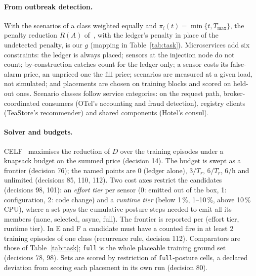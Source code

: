 \documentclass{ceurart}
\begin{document}
\paragraph{From outbreak detection.} With the scenarios of a class weighted equally and $\pi_i(t) = \min\{t, T_{\max}\}$,
the penalty reduction $R(A)$ of~\cite{leskovec_cost-effective_2007}, with the ledger's penalty in place of the undetected
penalty, is our $g$ (mapping in Table~\ref{tab:task}). Microservices add six constraints: the ledger is always placed;
sensors at the injection node do not count; by-construction catches count for the ledger only; a sensor costs its
false-alarm price, an unpriced one the fill price; scenarios are measured at a given load, not simulated; and placements
are chosen on training blocks and scored on held-out ones. Scenario classes follow service categories: on the request path,
broker-coordinated consumers (OTel's accounting and fraud detection), registry clients (TeaStore's recommender) and shared
components (Hotel's consul).

\paragraph{Solver and budgets.} CELF~\cite{leskovec_cost-effective_2007} maximises the reduction of $D$ over the training episodes under a knapsack
budget on the summed price (decision 14). The budget is swept as a frontier (decision 76); the named points are 0
(ledger alone), $3/T_r$, $6/T_r$, 6/h and unlimited (decisions 85, 110, 112). Two cost axes restrict the candidates
(decisions 98, 101): an \emph{effort tier} per sensor (0: emitted out of the box, 1: configuration, 2: code change) and
a \emph{runtime tier} (below 1\,\%, 1--10\,\%, above 10\,\% CPU), where a set pays the cumulative posture steps needed to
emit all its members (none, selected, async, full). The frontier is reported per (effort tier, runtime tier).
In E and F a candidate must have a counted fire in at least 2 training episodes of one class (recurrence rule,
decision 112). Comparators are those of Table~\ref{tab:task}; \texttt{full} is the whole placeable training ground set (decisions 78, 98). Sets are scored by restriction of
\texttt{full}-posture cells, a declared deviation from scoring each placement in its own run (decision 80).
\end{document}
